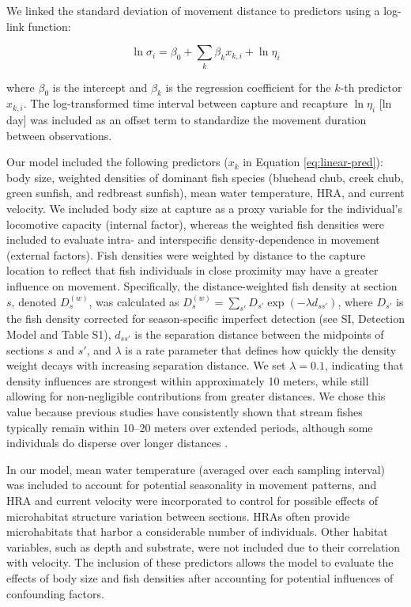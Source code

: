 \documentclass[11pt, class=article, crop=false]{standalone}
\begin{document}
We linked the standard deviation of  movement distance to predictors using a log-link function: 

\begin{equation}
    \ln \sigma_i = \beta_0 + \sum_{k} \beta_k x_{k,i} + \ln \eta_i
    \label{eq:linear-pred}
\end{equation}

where $\beta_0$ is the intercept and $\beta_k$ is the regression coefficient for the $k$-th predictor $x_{k,i}$. The log-transformed time interval between capture and recapture $\ln \eta_i$ [ln day] was included as an offset term to standardize the movement duration between observations.

Our model included the following predictors ($x_k$ in Equation \ref{eq:linear-pred}): body size, weighted densities of dominant fish species (bluehead chub, creek chub, green sunfish, and redbreast sunfish), mean water temperature, HRA, and current velocity.
We included body size at capture as a proxy variable for the individual’s locomotive capacity (internal factor), whereas the weighted fish densities were included to evaluate intra- and interspecific density-dependence in movement (external factors).
Fish densities were weighted by distance to the capture location to reflect that fish individuals in close proximity may have a greater influence on movement.
Specifically, the distance-weighted fish density at section $s$, denoted $D^{(w)}_s$, was calculated as $D^{(w)}_s = \sum_{s'} D_{s'}\exp(-\lambda d_{ss'})$, where $D_{s'}$ is the fish density corrected for season-specific imperfect detection (see SI, Detection Model and Table S1), $d_{ss'}$ is the separation distance between the midpoints of sections $s$ and $s'$, and $\lambda$ is a rate parameter that defines how quickly the density weight decays with increasing separation distance. 
We set $\lambda = 0.1$, indicating that density influences are strongest within approximately 10 meters, while still allowing for non-negligible contributions from greater distances.
We chose this value because previous studies have consistently shown that stream fishes typically remain within 10–20 meters over extended periods, although some individuals do disperse over longer distances \citep{skalskiModelingDiffusiveSpread2000, pepinoFishDispersalFragmented2012, rodriguezRestrictedMovementStream2002, teruiNonrandomDispersalSympatric2021, radingerPatternsPredictorsFish2014}.

In our model, mean water temperature (averaged over each sampling interval) was included to account for potential seasonality in movement patterns, and HRA and current velocity were incorporated to control for possible effects of microhabitat structure variation between sections. HRAs often provide microhabitats that harbor a considerable number of individuals. Other habitat variables, such as depth and substrate, were not included due to their correlation with velocity. The inclusion of these predictors allows the model to evaluate the effects of body size and fish densities after accounting for potential influences of confounding factors.
\end{document}
